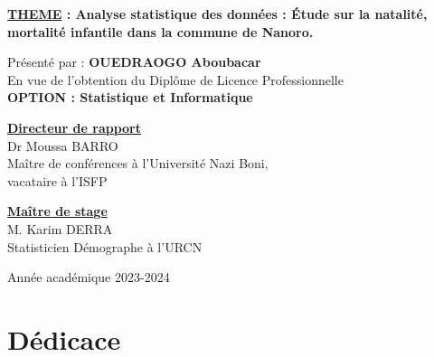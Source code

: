 \documentclass[12pt,a4paper]{report}
\begin{document}
	\begin{center}
		\begin{tcolorbox}[colback=mycolor, colframe=mycolor, width=1\textwidth, boxrule=0.6mm, arc=1mm ]
			\centering
				\textcolor{moncolor}{\textbf{\Large{\underline{THEME} : Analyse statistique des données : Étude sur la natalité, mortalité infantile dans la commune de Nanoro.}}}
		\end{tcolorbox}
	\end{center}
	\begin{center}
		Présenté par : \textbf{OUEDRAOGO Aboubacar}\\
		\large En vue de l'obtention du Diplôme de Licence Professionnelle \\
		\textbf{\large OPTION : Statistique et Informatique}\\
	\end{center}
	
	\begin{minipage}{0.65\textwidth}
		\textbf{\underline{Directeur de rapport}}\\
		Dr Moussa BARRO\\
		Maître de conférences à l’Université Nazi Boni,\\
		vacataire à l'ISFP
	\end{minipage}
	\begin{minipage}{0.4\textwidth}
		\textbf{\underline{Maître de stage}}\\
		M. Karim DERRA\\
		Statisticien Démographe à l'URCN
	\end{minipage}
	
	\vspace{1.5cm}
	\begin{center}
		Année académique 2023-2024
	\end{center}
	
	\thispagestyle{empty}
	

		\newpage
	
	\renewcommand{\thepage}{\small\roman{page}}
	
	\chapter*{Dédicace}       %
	
\end{document}
